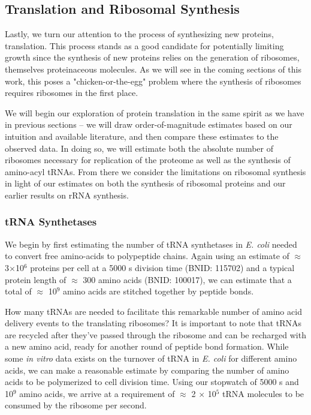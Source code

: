 \subsection{Translation and Ribosomal Synthesis}
Lastly, we turn our attention to the process of synthesizing new proteins,
translation. This process stands as a good candidate for potentially limiting
growth since the synthesis of new proteins relies on the generation of
ribosomes, themselves proteinaceous molecules. As we will see in the coming
sections of this work, this poses a "chicken-or-the-egg" problem where the
synthesis of ribosomes requires ribosomes in the first place.

We will begin our exploration of protein translation in the same spirit as we
have in previous sections -- we will draw order-of-magnitude estimates based
on our intuition and available literature, and then compare these estimates
to the observed data. In doing so, we will estimate both the absolute number
of ribosomes necessary for replication of the proteome as well as the
synthesis of amino-acyl tRNAs. From there we consider the limitations on
ribosomal synthesis in light of our estimates on both the synthesis of
ribosomal proteins and our earlier results on rRNA synthesis.

\subsubsection{tRNA Synthetases}
We begin by first estimating the number of tRNA synthetases in \textit{E.
coli} needed to convert free amino-acids to polypeptide chains. Again using
an estimate of $\approx$ 3$\times$10$^6$ proteins per cell at a 5000 s
division time (BNID: 115702) and a typical protein length of $\approx$ 300
amino acids (BNID: 100017), we can estimate that a total of $\approx$ 10$^9$
amino acids are stitched together by peptide bonds.

How many tRNAs are needed to facilitate this remarkable number of amino acid
delivery events to the translating ribosomes? It is important to note that tRNAs
are recycled after they've passed through the ribosome and can be recharged with
a new amino acid, ready for another round of peptide bond formation. While some
\textit{in vitro} data exists on  the turnover of tRNA in \textit{E. coli} for
different  amino acids, we can make a reasonable estimate by comparing the
number of amino acids to be  polymerized to cell division time. Using our
stopwatch of 5000 s and 10$^9$ amino acids, we arrive at a requirement of
$\approx$ 2 $\times$ 10$^5$ tRNA molecules to be consumed by the ribosome per
second.

